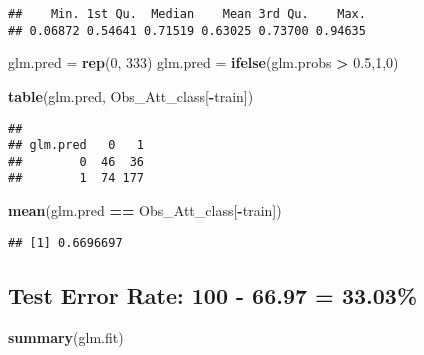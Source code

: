 \documentclass[]{article}
\newenvironment{Shaded}{\begin{snugshade}}{\end{snugshade}}
\newcommand{\KeywordTok}[1]{\textcolor[rgb]{0.13,0.29,0.53}{\textbf{#1}}}
\newcommand{\DecValTok}[1]{\textcolor[rgb]{0.00,0.00,0.81}{#1}}
\newcommand{\FloatTok}[1]{\textcolor[rgb]{0.00,0.00,0.81}{#1}}
\newcommand{\StringTok}[1]{\textcolor[rgb]{0.31,0.60,0.02}{#1}}
\newcommand{\OperatorTok}[1]{\textcolor[rgb]{0.81,0.36,0.00}{\textbf{#1}}}
\newcommand{\NormalTok}[1]{#1}
\begin{document}
\begin{verbatim}
##    Min. 1st Qu.  Median    Mean 3rd Qu.    Max. 
## 0.06872 0.54641 0.71519 0.63025 0.73700 0.94635
\end{verbatim}

\begin{Shaded}
\begin{Highlighting}[]
\NormalTok{glm.pred =}\StringTok{ }\KeywordTok{rep}\NormalTok{(}\DecValTok{0}\NormalTok{, }\DecValTok{333}\NormalTok{)}
\NormalTok{glm.pred =}\StringTok{ }\KeywordTok{ifelse}\NormalTok{(glm.probs }\OperatorTok{>}\StringTok{ }\FloatTok{0.5}\NormalTok{,}\DecValTok{1}\NormalTok{,}\DecValTok{0}\NormalTok{)}

\KeywordTok{table}\NormalTok{(glm.pred, Obs_Att_class[}\OperatorTok{-}\NormalTok{train])}
\end{Highlighting}
\end{Shaded}

\begin{verbatim}
##         
## glm.pred   0   1
##        0  46  36
##        1  74 177
\end{verbatim}

\begin{Shaded}
\begin{Highlighting}[]
\KeywordTok{mean}\NormalTok{(glm.pred }\OperatorTok{==}\StringTok{ }\NormalTok{Obs_Att_class[}\OperatorTok{-}\NormalTok{train])}
\end{Highlighting}
\end{Shaded}

\begin{verbatim}
## [1] 0.6696697
\end{verbatim}

\subsection{Test Error Rate: 100 - 66.97 =
33.03\%}\label{test-error-rate-100---66.97-33.03}

\begin{Shaded}
\begin{Highlighting}[]
\KeywordTok{summary}\NormalTok{(glm.fit)}
\end{Highlighting}
\end{Shaded}
\end{document}
